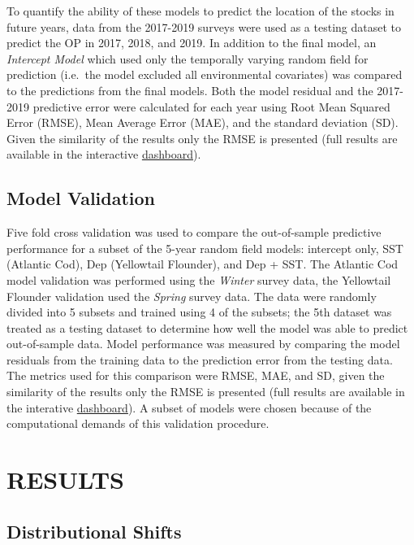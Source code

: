 \documentclass[
]{article}
\begin{document}
To quantify the ability of these models to predict the location of the stocks in future years, data from the 2017-2019 surveys were used as a testing dataset to predict the OP in 2017, 2018, and 2019. In addition to the final model, an \emph{Intercept Model} which used only the temporally varying random field for prediction (i.e.~the model excluded all environmental covariates) was compared to the predictions from the final models. Both the model residual and the 2017-2019 predictive error were calculated for each year using Root Mean Squared Error (RMSE), Mean Average Error (MAE), and the standard deviation (SD). Given the similarity of the results only the RMSE is presented (full results are available in the interactive \href{https://github.com/Dave-Keith/Paper_2_SDMs/tree/master/Dashboard}{dashboard}).

\hypertarget{model-validation}{%
\subsection{Model Validation}\label{model-validation}}

Five fold cross validation was used to compare the out-of-sample predictive performance for a subset of the 5-year random field models: intercept only, SST (Atlantic Cod), Dep (Yellowtail Flounder), and Dep + SST. The Atlantic Cod model validation was performed using the \emph{Winter} survey data, the Yellowtail Flounder validation used the \emph{Spring} survey data. The data were randomly divided into 5 subsets and trained using 4 of the subsets; the 5th dataset was treated as a testing dataset to determine how well the model was able to predict out-of-sample data. Model performance was measured by comparing the model residuals from the training data to the prediction error from the testing data. The metrics used for this comparison were RMSE, MAE, and SD, given the similarity of the results only the RMSE is presented (full results are available in the interative \href{https://github.com/Dave-Keith/Paper_2_SDMs/tree/master/Dashboard}{dashboard}). A subset of models were chosen because of the computational demands of this validation procedure.

\hypertarget{ref-results}{%
\section{RESULTS}\label{ref-results}}

\hypertarget{distributional-shifts}{%
\subsection{Distributional Shifts}\label{distributional-shifts}}
\end{document}
